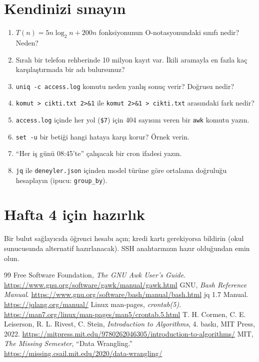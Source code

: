 \documentclass[11pt,a4paper]{article}
\begin{document}
\section{Kendinizi sınayın}
\begin{enumerate}
  \item $T(n) = 5n\log_2 n + 200n$ fonksiyonunun O-notasyonundaki sınıfı nedir? Neden?
  \item Sıralı bir telefon rehberinde 10 milyon kayıt var. İkili aramayla en fazla kaç karşılaştırmada bir adı bulursunuz?
  \item \texttt{uniq -c access.log} komutu neden yanlış sonuç verir? Doğrusu nedir?
  \item \texttt{komut > cikti.txt 2>\&1} ile \texttt{komut 2>\&1 > cikti.txt} arasındaki fark nedir?
  \item \texttt{access.log} içinde her yol (\texttt{\$7}) için 404 sayısını veren bir \texttt{awk} komutu yazın.
  \item \texttt{set -u} bir betiği hangi hataya karşı korur? Örnek verin.
  \item ``Her iş günü 08:45'te'' çalışacak bir cron ifadesi yazın.
  \item \texttt{jq} ile \texttt{deneyler.json} içinden model türüne göre ortalama doğruluğu hesaplayın (ipucu: \texttt{group\_by}).
\end{enumerate}

\section*{Hafta 4 için hazırlık}
Bir bulut sağlayıcıda öğrenci hesabı açın; kredi kartı gerekiyorsa bildirin (okul sunucusunda alternatif hazırlanacak). SSH anahtarınızın hazır olduğundan emin olun.

\begin{thebibliography}{99}\small
{} Free Software Foundation, \emph{The GNU Awk User's Guide}. \url{https://www.gnu.org/software/gawk/manual/gawk.html}
 GNU, \emph{Bash Reference Manual}. \url{https://www.gnu.org/software/bash/manual/bash.html}
 jq 1.7 Manual. \url{https://jqlang.org/manual/}
 Linux man-pages, \emph{crontab(5)}. \url{https://man7.org/linux/man-pages/man5/crontab.5.html}
 T. H. Cormen, C. E. Leiserson, R. L. Rivest, C. Stein, \emph{Introduction to Algorithms}, 4. baskı, MIT Press, 2022. \url{https://mitpress.mit.edu/9780262046305/introduction-to-algorithms/}
 MIT, \emph{The Missing Semester}, ``Data Wrangling.'' \url{https://missing.csail.mit.edu/2020/data-wrangling/}
\end{thebibliography}
\end{document}
